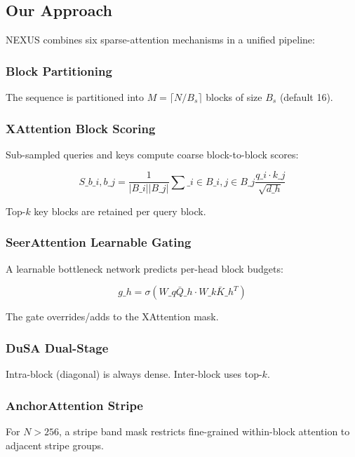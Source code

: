 \subsection{Our Approach}

NEXUS combines six sparse-attention mechanisms in a unified pipeline:

\subsubsection{Block Partitioning}

The sequence is partitioned into $M = \lceil N / B_s \rceil$ blocks of size 
$B_s$ (default 16).

\subsubsection{XAttention Block Scoring}

Sub-sampled queries and keys compute coarse block-to-block scores:

\[
S\_{b\_i, b\_j} = \frac{1}{|B\_i| |B\_j|} \sum\_{i \in B\_i, j \in B\_j} \frac{q\_i \cdot k\_j}{\sqrt{d\_h}}
\tag{1.2}
\]

Top-$k$ key blocks are retained per query block.

\subsubsection{SeerAttention Learnable Gating}

A learnable bottleneck network predicts per-head block budgets:

\[
g\_h = \sigma(W\_q \bar{Q}\_h \cdot W\_k \bar{K}\_h^T)
\tag{1.3}
\]

The gate overrides/adds to the XAttention mask.

\subsubsection{DuSA Dual-Stage}

Intra-block (diagonal) is always dense. Inter-block uses top-$k$.

\subsubsection{AnchorAttention Stripe}

For $N > 256$, a stripe band mask restricts fine-grained within-block 
attention to adjacent stripe groups.

